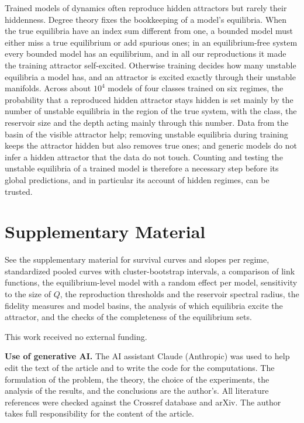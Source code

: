 \documentclass[aip,cha,reprint,amsmath,amssymb,longbibliography]{revtex4-2}
\theoremstyle{definition}
\begin{document}
Trained models of dynamics often reproduce hidden attractors but rarely their hiddenness. Degree theory fixes the bookkeeping
of a model's equilibria. When the true equilibria have an index sum different from one, a bounded model must either miss a
true equilibrium or add spurious ones; in an equilibrium-free system every bounded model has an equilibrium, and in all
our reproductions it made the training attractor self-excited. Otherwise
training decides how many unstable equilibria a model has, and an attractor is excited exactly through their unstable
manifolds. Across about $10^4$ models of four classes trained on six regimes, the probability that a reproduced hidden
attractor stays hidden is set mainly by the number of unstable equilibria in the region of the true system, with the class, the
reservoir size and the depth acting mainly through this number. Data from the basin of the visible attractor help; removing unstable equilibria during training keeps the attractor hidden but also removes true
ones; and generic models do not infer a hidden attractor that the data do not touch. Counting and testing the unstable
equilibria of a trained model is therefore a necessary step before its global predictions, and in particular its account of
hidden regimes, can be trusted.

\section*{Supplementary Material}
See the supplementary material for survival curves and slopes per regime, standardized pooled curves with cluster-bootstrap
intervals, a comparison of link functions, the equilibrium-level model with a random effect per model, sensitivity to the
size of $Q$, the reproduction thresholds and the reservoir spectral radius, the fidelity measures and model basins,
the analysis of which equilibria excite the attractor, and the checks of the completeness of the equilibrium sets.

\begin{acknowledgments}
This work received no external funding.

\textbf{Use of generative AI.} The AI assistant Claude (Anthropic) was used to help edit the text of the article and to write the code for the computations. The formulation of the problem, the theory, the choice of the experiments, the analysis of the results, and the conclusions are the author's. All literature references were checked against the Crossref database and arXiv. The author takes full responsibility for the content of the article.
\end{acknowledgments}
\end{document}
